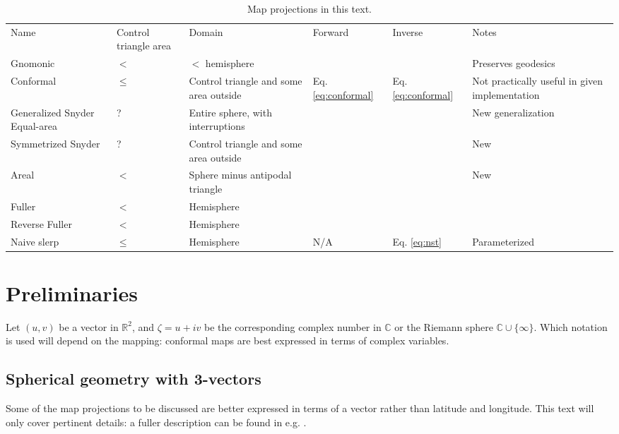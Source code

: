 \documentclass{amsart}[12pt]
\begin{document}
\begin{table}
\begin{tabular}[]{p{2cm}|p{2cm}p{2cm}p{1.4cm}p{1.4cm}p{5cm}}
  Name & Control triangle area & Domain & Forward & Inverse & Notes \\
  Gnomonic & $<$  & $<$ hemisphere & & & Preserves geodesics \\
  Conformal & $\le$  & Control triangle and some area outside
    & Eq. \ref{eq:conformal} & Eq. \ref{eq:conformal} & Not practically useful in given implementation\\
  Generalized Snyder Equal-area & ? & Entire sphere, with interruptions & & & New generalization\\
  Symmetrized Snyder & ? & Control triangle and some area outside &
    & & New \\
  Areal & $<$ & Sphere minus antipodal triangle & & & New\\
  Fuller & $<$ & Hemisphere & & & \cite{kenner}\cite{gray94}\cite{gray95}\\
  Reverse Fuller & $<$ & Hemisphere & & & \\
  Naive slerp & $\le$ & Hemisphere & N/A &
    Eq. \ref{eq:nst}  & Parameterized\\
\end{tabular}
\caption{Map projections in this text.}
\label{fig:projs}
\end{table}

\section{Preliminaries}
Let $(u,v)$ be a vector in $\mathbb R^2$, and $\zeta = u + i v$ be the
corresponding complex number in $\mathbb C$ or the Riemann sphere $\mathbb C
\cup \{\infty\}$. Which notation is used will depend on the mapping:
conformal maps are best expressed in terms of complex variables.

\subsection{Spherical geometry with 3-vectors}
Some of the map projections to be discussed are better expressed
in terms of a vector rather than latitude and longitude. This text will only
cover pertinent details: a fuller description can be found in e.g. \cite{gade}.
\end{document}
